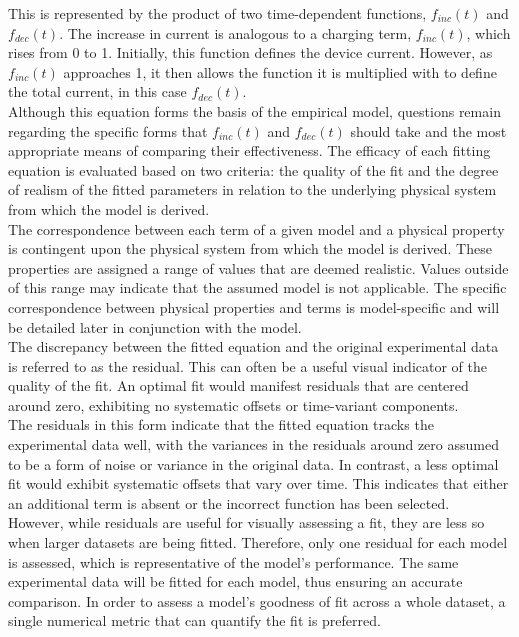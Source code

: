 \noindent This is represented by the product of two time-dependent functions, $f_{inc}(t)$ and $f_{dec}(t)$. The increase in current is analogous to a charging term, $f_{inc}(t)$, which rises from 0 to 1. Initially, this function defines the device current. However, as $f_{inc}(t)$ approaches 1, it then allows the function it is multiplied with to define the total current, in this case  $f_{dec}(t)$. \\

\noindent Although this equation forms the basis of the empirical model, questions remain regarding the specific forms that $f_{inc}(t)$ and $f_{dec}(t)$ should take and the most appropriate means of comparing their effectiveness. The efficacy of each fitting equation is evaluated based on two criteria: the quality of the fit and the degree of realism of the fitted parameters in relation to the underlying physical system from which the model is derived.\\

\noindent The correspondence between each term of a given model and a physical property is contingent upon the physical system from which the model is derived. These properties are assigned a range of values that are deemed realistic. Values outside of this range may indicate that the assumed model is not applicable. The specific correspondence between physical properties and terms is model-specific and will be detailed later in conjunction with the model.\\

\noindent The discrepancy between the fitted equation and the original experimental data is referred to as the residual. This can often be a useful visual indicator of the quality of the fit. An optimal fit would manifest residuals that are centered around zero, exhibiting no systematic offsets or time-variant components. \\

\noindent The residuals in this form indicate that the fitted equation tracks the experimental data well, with the variances in the residuals around zero assumed to be a form of noise or variance in the original data. In contrast, a less optimal fit would exhibit systematic offsets that vary over time. This indicates that either an additional term is absent or the incorrect function has been selected. \\

\noindent However, while residuals are useful for visually assessing a fit, they are less so when larger datasets are being fitted. Therefore, only one residual for each model is assessed, which is representative of the model's performance. The same experimental data will be fitted for each model, thus ensuring an accurate comparison. In order to assess a model's goodness of fit across a whole dataset, a single numerical metric that can quantify the fit is preferred.\\


